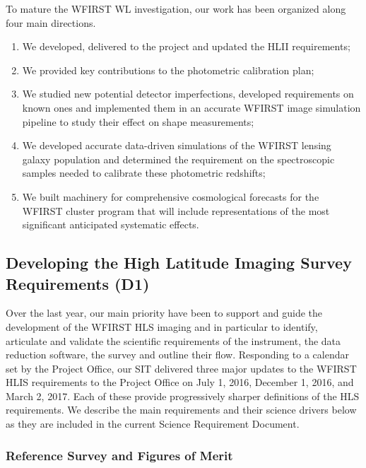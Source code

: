 \begin{summary}
To mature the WFIRST WL investigation, our work has been organized along four main
directions.
\begin{enumerate}
  \item We developed, delivered to the project and
updated the HLII requirements;
\item We provided key contributions to the
photometric calibration plan;
\item We studied new potential detector imperfections,
developed requirements on known ones and implemented them in an accurate
WFIRST image simulation pipeline to study their effect on shape measurements;
\item We developed accurate data-driven simulations of the WFIRST lensing galaxy population and determined the
requirement on the spectroscopic samples needed to calibrate these photometric redshifts;
\item We built machinery for comprehensive cosmological forecasts for the WFIRST cluster program that
will include representations of the most significant anticipated systematic effects.
\end{enumerate}
\end{summary}


 \subsection{Developing the High Latitude Imaging Survey Requirements (D1)}

 \begin{summaryii}
   Over the last year, our main priority have been to support and guide the
   development of the WFIRST HLS imaging and in particular to identify,
   articulate and validate the scientific requirements of the instrument, the
   data reduction software, the survey and outline their flow. Responding to a calendar set by the
   Project Office, our SIT delivered three major updates to the WFIRST HLIS
   requirements to the Project Office on July 1, 2016, December 1, 2016, and
   March 2, 2017. Each of these provide progressively sharper definitions of the
   HLS requirements. We describe the main requirements and their science drivers
   below as they are included in the current Science Requirement Document.
 \end{summaryii}

\subsubsection{Reference Survey and Figures of Merit}

